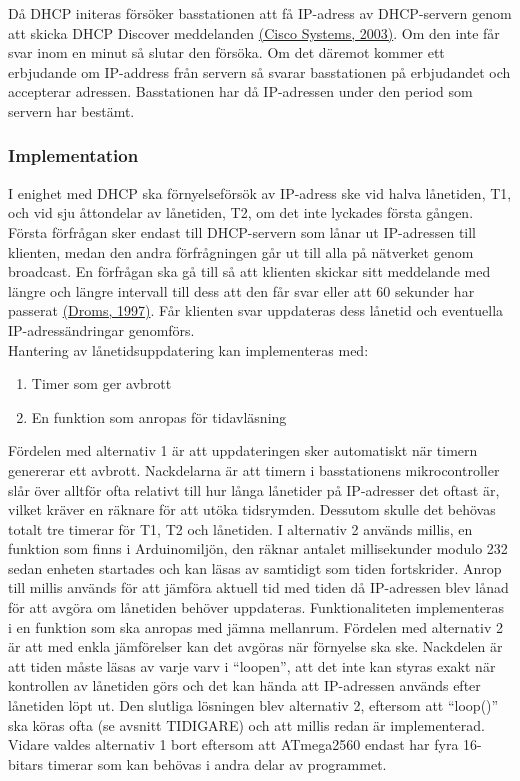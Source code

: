 \documentclass[a4paper,11pt]{article}
\begin{document}
Då DHCP initeras försöker basstationen att få IP-adress av DHCP-servern genom att skicka DHCP Discover meddelanden \hyperref[cisco]{(Cisco Systems, 2003)}. Om den inte får svar inom en minut så slutar den försöka. Om det däremot kommer ett erbjudande om IP-address från servern så svarar basstationen på erbjudandet och accepterar adressen. Basstationen har då IP-adressen under den period som servern har bestämt.    

\subsubsection{Implementation}
I enighet med DHCP ska förnyelseförsök av IP-adress ske vid halva lånetiden, T1, och vid sju åttondelar av lånetiden, T2, om det inte lyckades första gången. Första förfrågan sker endast till DHCP-servern som lånar ut IP-adressen till klienten, medan den andra förfrågningen går ut till alla på nätverket genom broadcast. En förfrågan ska gå till så att klienten skickar sitt meddelande med längre och längre intervall till dess att den får svar eller att 60 sekunder har passerat \hyperref[droms]{(Droms, 1997)}. Får klienten svar uppdateras dess lånetid och eventuella IP-adressändringar genomförs.\\

Hantering av lånetidsuppdatering kan implementeras med:

	\begin{enumerate}
	\item Timer som ger avbrott
    	\item En funktion som anropas för tidavläsning
	\end{enumerate}
	
Fördelen med alternativ 1 är att uppdateringen sker automatiskt när timern genererar ett avbrott. Nackdelarna är att timern i basstationens mikrocontroller slår över alltför ofta relativt till hur långa lånetider på IP-adresser det oftast är, vilket kräver en räknare för att utöka tidsrymden. Dessutom skulle det behövas totalt tre timerar för T1, T2 och lånetiden. I alternativ 2 används millis, en funktion som finns i Arduinomiljön, den räknar antalet millisekunder modulo 232 sedan enheten startades och kan läsas av samtidigt som tiden fortskrider. Anrop till millis används för att jämföra aktuell tid med tiden då IP-adressen blev lånad för att avgöra om lånetiden behöver uppdateras. Funktionaliteten implementeras i en funktion som ska anropas med jämna mellanrum. Fördelen med alternativ 2 är att med enkla jämförelser kan det avgöras när förnyelse ska ske. Nackdelen är att tiden måste läsas av varje varv i “loopen”, att det inte kan styras exakt när kontrollen av lånetiden görs och det kan hända att IP-adressen används efter lånetiden löpt ut. Den slutliga lösningen blev alternativ 2, eftersom att “loop()” ska köras ofta (se avsnitt TIDIGARE) och att millis redan är implementerad. Vidare valdes alternativ 1 bort eftersom att ATmega2560 endast har fyra 16-bitars timerar som kan behövas i andra delar av programmet.\\
\end{document}
